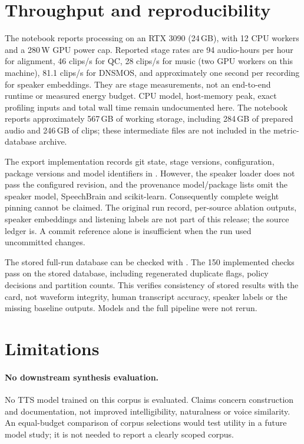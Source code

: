 \documentclass[11pt,a4paper]{article}
\begin{document}
\section{Throughput and reproducibility}
\label{sec:cost}
The notebook reports processing on an RTX 3090 (24\,GB), with 12 CPU
workers and a 280\,W GPU power cap. Reported stage rates are 94 audio-hours
per hour for alignment, 46 clips/s for QC, 28 clips/s for music (two GPU
workers on this machine), 81.1 clips/s for DNSMOS, and approximately one
second per recording for speaker embeddings. They are stage measurements,
not an end-to-end runtime or measured energy budget. CPU model, host-memory
peak, exact profiling inputs and total wall time remain undocumented here.
The notebook reports approximately 567\,GB of working storage, including
284\,GB of prepared audio and 246\,GB of clips; these intermediate files
are not included in the metric-database archive.

The export implementation records git state, stage versions, configuration,
package versions and model identifiers in . However, the speaker
loader does not pass the configured revision, and the provenance model/package
lists omit the speaker model, SpeechBrain and scikit-learn. Consequently
complete weight pinning cannot be claimed. The original run record,
per-source ablation outputs, speaker embeddings and listening labels are not
part of this release; the source ledger is. A commit reference alone is
insufficient when the run used uncommitted changes.

The stored full-run database can be checked with
. The 150 implemented
checks pass on the stored database, including regenerated duplicate flags, policy decisions and
partition counts. This verifies consistency of stored results with the card,
not waveform integrity, human transcript accuracy, speaker labels or the
missing baseline outputs. Models and the full pipeline were not rerun.

\section{Limitations}
\label{sec:limits}
\paragraph{No downstream synthesis evaluation.}
No TTS model trained on this corpus is evaluated. Claims concern construction
and documentation, not improved intelligibility, naturalness or voice similarity.
An equal-budget comparison of corpus selections would test utility in a
future model study; it is not needed to report a clearly scoped corpus.
\end{document}
